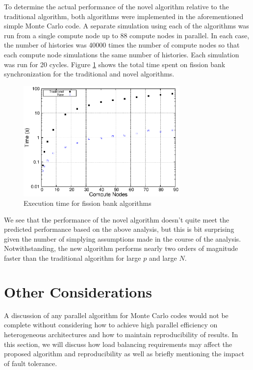 To determine the actual performance of the novel algorithm relative to
the traditional algorithm, both algorithms were implemented in the
aforementioned simple Monte Carlo code. A separate simulation using
each of the algorithms was run from a single compute node up to 88
compute nodes in parallel. In each case, the number of histories was
40000 times the number of compute nodes so that each compute node
simulations the same number of histories. Each simulation was run for
20 cycles. Figure \ref{fig:algorithm-time} shows the total time spent
on fission bank synchronization for the traditional and novel
algorithms.
\begin{figure}[ht]
  \centering
  \includegraphics[width=0.75\textwidth]{figures/algorithm_results/time.eps}
  \caption{Execution time for fission bank algorithms}
  \label{fig:algorithm-time}
\end{figure}
We see that the performance of the novel algorithm doesn't quite meet
the predicted performance based on the above analysis, but this is bit
surprising given the number of simplying assumptions made in the
course of the analysis. Notwithstanding, the new algorithm performs
nearly two orders of magnitude faster than the traditional algorithm
for large $p$ and large $N$.

\section{Other Considerations}
\label{sec:other}

A discussion of any parallel algorithm for Monte Carlo codes would not
be complete without considering how to achieve high parallel
efficiency on heterogeneous architectures and how to maintain
reproducibility of results. In this section, we will discuss how load
balancing requirements may affect the proposed algorithm and
reproducibility as well as briefly mentioning the impact of fault
tolerance.

